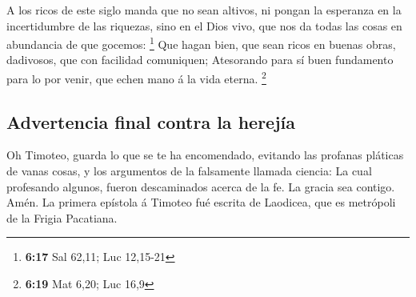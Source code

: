  A los ricos de este siglo manda que no sean altivos, ni
pongan la esperanza en la incertidumbre de las riquezas, sino en el Dios
vivo, que nos da todas las cosas en abundancia de que gocemos:
\footnote{\textbf{6:17} Sal 62,11; Luc 12,15-21}  Que
hagan bien, que sean ricos en buenas obras, dadivosos, que con facilidad
comuniquen;  Atesorando para sí buen fundamento para lo
por venir, que echen mano á la vida eterna. \footnote{\textbf{6:19} Mat
  6,20; Luc 16,9}

\hypertarget{advertencia-final-contra-la-herejuxeda}{%
\subsection{Advertencia final contra la
herejía}\label{advertencia-final-contra-la-herejuxeda}}

 Oh Timoteo, guarda lo que se te ha encomendado, evitando
las profanas pláticas de vanas cosas, y los argumentos de la falsamente
llamada ciencia:  La cual profesando algunos, fueron
descaminados acerca de la fe. La gracia sea contigo. Amén. La primera
epístola á Timoteo fué escrita de Laodicea, que es metrópoli de la
Frigia Pacatiana.
